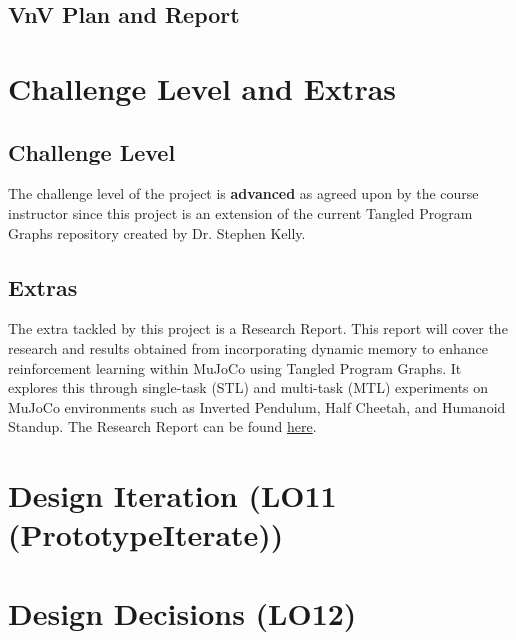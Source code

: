\documentclass{article}
\begin{document}
\subsection{VnV Plan and Report}

\section{Challenge Level and Extras}

\subsection{Challenge Level}
The challenge level of the project is \textbf{advanced} as agreed upon by the course instructor since this project is an extension of the current Tangled Program Graphs repository created by Dr. Stephen Kelly.

\subsection{Extras}
The extra tackled by this project is a Research Report. This report will cover the research and results obtained from incorporating dynamic memory to enhance reinforcement learning within MuJoCo using Tangled Program Graphs.
It explores this through single-task (STL) and multi-task (MTL) experiments on MuJoCo environments such as Inverted Pendulum, Half Cheetah, and Humanoid Standup.
The Research Report can be found \href{https://github.com/TPGEngine/tpg/blob/main/docs/Extras/ResearchReport(Advanced)/ResearchReport.pdf}{here}.

\section{Design Iteration (LO11 (PrototypeIterate))}



\section{Design Decisions (LO12)}
\end{document}
